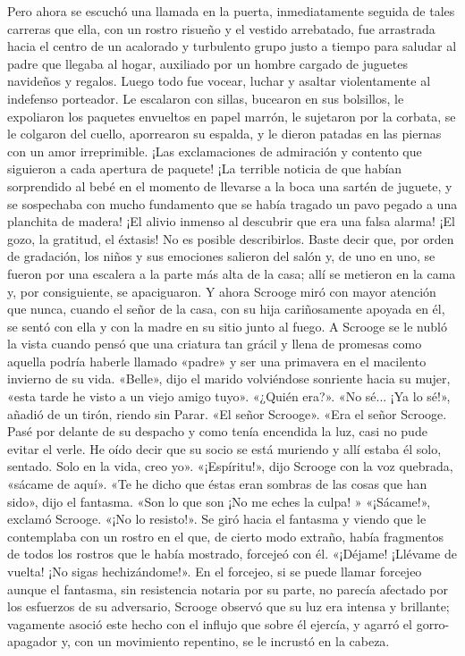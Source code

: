 \documentclass{novela}
\begin{document}
 Pero ahora se escuchó una llamada en la puerta, inmediatamente seguida de tales carreras que ella, con un rostro risueño y el vestido arrebatado, fue arrastrada hacia el centro de un acalorado y turbulento grupo justo a tiempo para saludar al padre que llegaba al hogar, auxiliado por un hombre cargado de juguetes navideños y regalos. Luego todo fue vocear, luchar y asaltar violentamente al indefenso porteador. Le escalaron con sillas, bucearon en sus bolsillos, le expoliaron los paquetes envueltos en papel marrón, le sujetaron por la corbata, se le colgaron del cuello, aporrearon su espalda, y le dieron patadas en las piernas con un amor irreprimible. ¡Las exclamaciones de admiración y contento que siguieron a cada apertura de paquete! ¡La terrible noticia de que habían sorprendido al bebé en el momento de llevarse a la boca una sartén de juguete, y se sospechaba con mucho fundamento que se había tragado un pavo pegado a una planchita de madera! ¡El alivio inmenso al descubrir que era una falsa alarma! ¡El gozo, la gratitud, el éxtasis! No es posible describirlos. Baste decir que, por orden de gradación, los niños y sus emociones salieron del salón y, de uno en uno, se fueron por una escalera a la parte más alta de la casa; allí se metieron en la cama y, por consiguiente, se apaciguaron.
 Y ahora Scrooge miró con mayor atención que nunca, cuando el señor de la casa, con su hija cariñosamente apoyada en él, se sentó con ella y con la madre en su sitio junto al fuego. A Scrooge se le nubló la vista cuando pensó que una criatura tan grácil y llena de promesas como aquella podría haberle llamado «padre» y ser una primavera en el macilento invierno de su vida.
 «Belle», dijo el marido volviéndose sonriente hacia su mujer, «esta tarde he visto a un viejo amigo tuyo».
 «¿Quién era?».
 «No sé... ¡Ya lo sé!», añadió de un tirón, riendo sin Parar. «El señor Scrooge».
 «Era el señor Scrooge. Pasé por delante de su despacho y como tenía encendida la luz, casi no pude evitar el verle. He oído decir que su socio se está muriendo y allí estaba él solo, sentado. Solo en la vida, creo yo».
 «¡Espíritu!», dijo Scrooge con la voz quebrada, «sácame de aquí».
 «Te he dicho que éstas eran sombras de las cosas que han sido», dijo el fantasma. «Son lo que son ¡No me eches la culpa! »
 «¡Sácame!», exclamó Scrooge. «¡No lo resisto!».
 Se giró hacia el fantasma y viendo que le contemplaba con un rostro en el que, de cierto modo extraño, había fragmentos de todos los rostros que le había mostrado, forcejeó con él.
 «¡Déjame! ¡Llévame de vuelta! ¡No sigas hechizándome!».
 En el forcejeo, si se puede llamar forcejeo aunque el fantasma, sin resistencia notaria por su parte, no parecía afectado por los esfuerzos de su adversario, Scrooge observó que su luz era intensa y brillante; vagamente asoció este hecho con el influjo que sobre él ejercía, y agarró el gorro-apagador y, con un movimiento repentino, se le incrustó en la cabeza.
\end{document}
